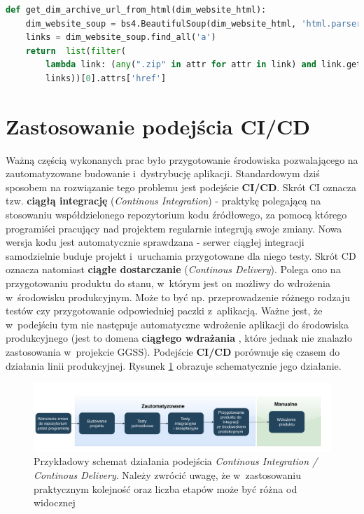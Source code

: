 \begin{lstlisting}[language=python, caption={Fragment skryptu \textit{dim\_download.py} odpowiedzialny za przetworzenie dokumentu HTML. Widoczne użycie elementów modułu \textit{BeautifulSoup4}.}, label={lst:bs4}]
def get_dim_archive_url_from_html(dim_website_html):
    dim_website_soup = bs4.BeautifulSoup(dim_website_html, 'html.parser')
    links = dim_website_soup.find_all('a')
    return  list(filter(
        lambda link: (any(".zip" in attr for attr in link) and link.getText().strip() == "dim.zip"), 
        links))[0].attrs['href']
\end{lstlisting}

\newpage

\section{Zastosowanie podejścia CI/CD}
Ważną częścią wykonanych prac było przygotowanie środowiska pozwalającego na zautomatyzowane budowanie i~dystrybucję aplikacji. Standardowym dziś sposobem na rozwiązanie tego problemu jest podejście \textbf{CI/CD}. Skrót CI oznacza tzw. \textbf{ciągłą integrację} (\textit{Continous Integration}) - praktykę polegającą na stosowaniu współdzielonego repozytorium kodu źródłowego, za pomocą którego programiści pracujący nad projektem regularnie integrują swoje zmiany. Nowa wersja kodu jest automatycznie sprawdzana - serwer ciągłej integracji samodzielnie buduje projekt i~uruchamia przygotowane dla niego testy. Skrót CD oznacza natomiast \textbf{ciągłe dostarczanie} (\textit{Continous Delivery}). Polega ono na przygotowaniu produktu do stanu, w~którym jest on możliwy do wdrożenia w~środowisku produkcyjnym. Może to być np. przeprowadzenie różnego rodzaju testów czy przygotowanie odpowiedniej paczki z~aplikacją. Ważne jest, że w~podejściu tym nie następuje automatyczne wdrożenie aplikacji do środowiska produkcyjnego (jest to domena \textbf{ciągłego wdrażania} \cite{CICDDef}, które jednak nie znalazło zastosowania w~projekcie GGSS). Podejście \textbf{CI/CD} porównuje się czasem do działania linii produkcyjnej. Rysunek \ref{fig:cicd} obrazuje schematycznie jego działanie. 

\begin{figure}[H]
\centering
\caption{Przykładowy schemat działania podejścia \textit{Continous Integration / Continous Delivery}. Należy zwrócić uwagę, że w~zastosowaniu praktycznym kolejność oraz liczba etapów może być różna od widocznej}
\label{fig:cicd}
\includegraphics[width=\textwidth]{res/CICD.pdf}
\end{figure}

